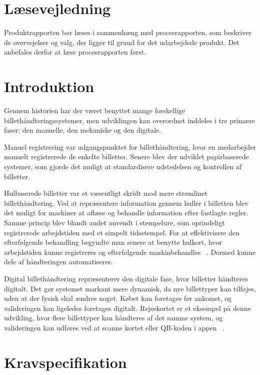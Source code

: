 \documentclass[a4paper, 11pt]{article}
\begin{document}


\newpage
\tableofcontents

\newpage

\section{Læsevejledning}

Produktrapporten bør læses i sammenhæng med procesrapporten, som beskriver de overvejelser
og valg, der ligger til grund for det udarbejdede produkt. Det anbefales derfor at læse
procesrapporten først.

\section{Introduktion}

Gennem historien har der været benyttet mange forskellige billethåndteringssystemer, men
udviklingen kan overordnet inddeles i tre primære faser: den manuelle, den mekaniske og den
digitale.

Manuel registrering var udgangspunktet for billethåndtering, hvor en medarbejder manuelt
registrerede de enkelte billetter. Senere blev der udviklet papirbaserede systemer, som gjorde
det muligt at standardisere udstedelsen og kontrollen af billetter.

Hulbaserede billetter var et væsentligt skridt mod mere strømlinet billethåndtering. Ved at
repræsentere information gennem huller i billetten blev det muligt for maskiner at aflæse og
behandle information efter fastlagte regler. Samme princip blev blandt andet anvendt i
stempelure, som oprindeligt registrerede arbejdstiden med et simpelt tidsstempel. For at
effektivisere den efterfølgende behandling begyndte man senere at benytte hulkort, hvor
arbejdstiden kunne registreres og efterfølgende maskinbehandles
~\cite{wikipedia_time_clock,wikipedia_punched_card}. Dermed kunne dele af håndteringen
automatiseres.

Digital billethåndtering repræsenterer den digitale fase, hvor billetter håndteres digitalt.
Det gør systemet markant mere dynamisk, da nye billettyper kan tilføjes, uden at der fysisk
skal ændres noget. Købet kan foretages før ankomst, og valideringen kan ligeledes foretages
digitalt. Rejsekortet er et eksempel på denne udvikling, hvor flere billettyper kan håndteres
af det samme system, og valideringen kan udføres ved at scanne kortet eller QR-koden i appen
~\cite{wikipedia_Rejsekort}.

\section{Kravspecifikation}
\end{document}
